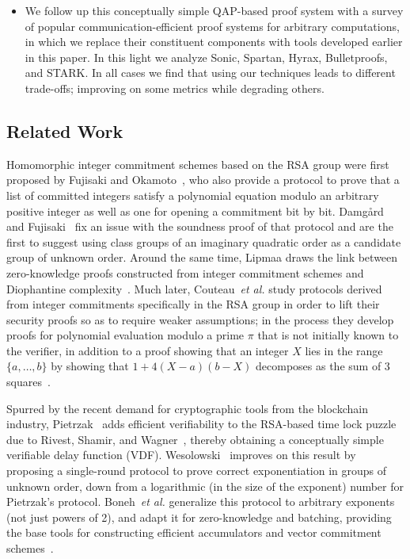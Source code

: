 \documentclass{article}
\theoremstyle{definition}
\newcommand{\alan}[1]{{\todo[color=blue!40!white]{Alan: #1}}}
\newcommand{\alan}[1]{}
\begin{document}
\begin{itemize}
    \item[] \alan{deprecated} We follow up this conceptually simple QAP-based proof system with a survey of popular communication-efficient proof systems for arbitrary computations, in which we replace their constituent components with tools developed earlier in this paper. In this light we analyze Sonic, Spartan, Hyrax, Bulletproofs, and STARK. In all cases we find that using our techniques leads to different trade-offs; improving on some metrics while degrading others.
\end{itemize}

\subsection{Related Work}

Homomorphic integer commitment schemes based on the RSA group were first proposed by Fujisaki and Okamoto~\cite{C:FujOka97}, who also provide a protocol to prove that a list of committed integers satisfy a polynomial equation modulo an arbitrary positive integer as well as one for opening a commitment bit by bit. Damgård and Fujisaki~\cite{AC:DamFuj02} fix an issue with the soundness proof of that protocol and are the first to suggest using class groups of an imaginary quadratic order as a candidate group of unknown order. Around the same time, Lipmaa draws the link between zero-knowledge proofs constructed from integer commitment schemes and Diophantine complexity~\cite{AC:Lipmaa03b}. Much later, Couteau~\emph{et al.} study protocols derived from integer commitments specifically in the RSA group in order to lift their security proofs so as to require weaker assumptions; in the process they develop proofs for polynomial evaluation modulo a prime $\pi$ that is not initially known to the verifier, in addition to a proof showing that an integer $X$ lies in the range $\{a, \ldots, b\}$ by showing that $1+4(X-a)(b-X)$ decomposes as the sum of 3 squares~\cite{EC:CouPetPoi17}.

Spurred by the recent demand for cryptographic tools from the blockchain industry, Pietrzak~\cite{Pietrzak18} adds efficient verifiability to the RSA-based time lock puzzle due to Rivest, Shamir, and Wagner~\cite{RivShaWag96}, thereby obtaining a conceptually simple verifiable delay function (VDF). Wesolowski~\cite{EC:Wesolowski19} improves on this result by proposing a single-round protocol to prove correct exponentiation in groups of unknown order, down from a logarithmic (in the size of the exponent) number for Pietrzak's protocol. Boneh~\emph{et al.} generalize this protocol to arbitrary exponents (not just powers of 2), and adapt it for zero-knowledge and batching, providing the base tools for constructing efficient accumulators and vector commitment schemes~\cite{C:BonBunFis19}.
\end{document}
